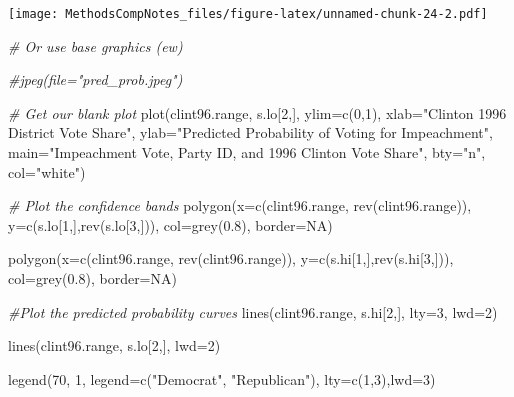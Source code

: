 \documentclass[
]{article}
\newenvironment{Shaded}{\begin{snugshade}}{\end{snugshade}}
\newcommand{\AttributeTok}[1]{\textcolor[rgb]{0.77,0.63,0.00}{#1}}
\newcommand{\CommentTok}[1]{\textcolor[rgb]{0.56,0.35,0.01}{\textit{#1}}}
\newcommand{\ConstantTok}[1]{\textcolor[rgb]{0.00,0.00,0.00}{#1}}
\newcommand{\DecValTok}[1]{\textcolor[rgb]{0.00,0.00,0.81}{#1}}
\newcommand{\FloatTok}[1]{\textcolor[rgb]{0.00,0.00,0.81}{#1}}
\newcommand{\FunctionTok}[1]{\textcolor[rgb]{0.00,0.00,0.00}{#1}}
\newcommand{\NormalTok}[1]{#1}
\newcommand{\StringTok}[1]{\textcolor[rgb]{0.31,0.60,0.02}{#1}}
\begin{document}
\texttt{[image: MethodsCompNotes\_files/figure-latex/unnamed-chunk-24-2.pdf]}

\begin{Shaded}
\begin{Highlighting}[]
\CommentTok{\# Or use base graphics (ew)}

\CommentTok{\#jpeg(file="pred\_prob.jpeg")}

\CommentTok{\# Get our blank plot}
\FunctionTok{plot}\NormalTok{(clint96.range, s.lo[}\DecValTok{2}\NormalTok{,], }\AttributeTok{ylim=}\FunctionTok{c}\NormalTok{(}\DecValTok{0}\NormalTok{,}\DecValTok{1}\NormalTok{),}
     \AttributeTok{xlab=}\StringTok{"Clinton 1996 District Vote Share"}\NormalTok{,}
     \AttributeTok{ylab=}\StringTok{"Predicted Probability of Voting for Impeachment"}\NormalTok{,}
     \AttributeTok{main=}\StringTok{"Impeachment Vote, Party ID, and 1996 Clinton Vote Share"}\NormalTok{,}
     \AttributeTok{bty=}\StringTok{"n"}\NormalTok{, }\AttributeTok{col=}\StringTok{"white"}\NormalTok{)}

\CommentTok{\# Plot the confidence bands}
\FunctionTok{polygon}\NormalTok{(}\AttributeTok{x=}\FunctionTok{c}\NormalTok{(clint96.range, }\FunctionTok{rev}\NormalTok{(clint96.range)),}
        \AttributeTok{y=}\FunctionTok{c}\NormalTok{(s.lo[}\DecValTok{1}\NormalTok{,],}\FunctionTok{rev}\NormalTok{(s.lo[}\DecValTok{3}\NormalTok{,])),}
        \AttributeTok{col=}\FunctionTok{grey}\NormalTok{(}\FloatTok{0.8}\NormalTok{), }\AttributeTok{border=}\ConstantTok{NA}\NormalTok{)}

\FunctionTok{polygon}\NormalTok{(}\AttributeTok{x=}\FunctionTok{c}\NormalTok{(clint96.range, }\FunctionTok{rev}\NormalTok{(clint96.range)),}
        \AttributeTok{y=}\FunctionTok{c}\NormalTok{(s.hi[}\DecValTok{1}\NormalTok{,],}\FunctionTok{rev}\NormalTok{(s.hi[}\DecValTok{3}\NormalTok{,])),}
        \AttributeTok{col=}\FunctionTok{grey}\NormalTok{(}\FloatTok{0.8}\NormalTok{), }\AttributeTok{border=}\ConstantTok{NA}\NormalTok{)}

\CommentTok{\#Plot the predicted probability curves}
\FunctionTok{lines}\NormalTok{(clint96.range, s.hi[}\DecValTok{2}\NormalTok{,], }\AttributeTok{lty=}\DecValTok{3}\NormalTok{, }\AttributeTok{lwd=}\DecValTok{2}\NormalTok{)}

\FunctionTok{lines}\NormalTok{(clint96.range, s.lo[}\DecValTok{2}\NormalTok{,], }\AttributeTok{lwd=}\DecValTok{2}\NormalTok{)}

\FunctionTok{legend}\NormalTok{(}\DecValTok{70}\NormalTok{, }\DecValTok{1}\NormalTok{, }\AttributeTok{legend=}\FunctionTok{c}\NormalTok{(}\StringTok{"Democrat"}\NormalTok{, }\StringTok{"Republican"}\NormalTok{), }\AttributeTok{lty=}\FunctionTok{c}\NormalTok{(}\DecValTok{1}\NormalTok{,}\DecValTok{3}\NormalTok{),}\AttributeTok{lwd=}\DecValTok{3}\NormalTok{)}
\end{Highlighting}
\end{Shaded}
\end{document}

